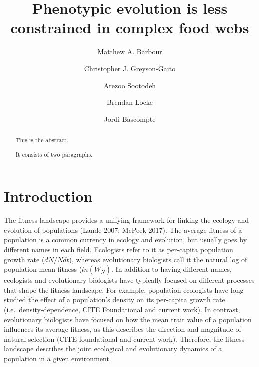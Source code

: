\documentclass[]{elsarticle} %
\begin{document}
\begin{frontmatter}

  \title{Phenotypic evolution is less constrained in complex food webs}
    \author[a,b]{Matthew A. Barbour}
    \author[a,c]{Christopher J. Greyson-Gaito}
  
  
    \author[a]{Arezoo Sootodeh}
  
  
    \author[d]{Brendan Locke}
  
  
    \author[b]{Jordi Bascompte}
  
  
      \address[a]{University of British Columbia, Department of Zoology, 6270 University
Blvd., Vancouver, BC, V6T 1Z4, Canada}
    \address[b]{University of Zurich, Department of Evolutionary Biology and
Environmental Studies, Winterthurerstrasse 190, Zurich, 8057,
Switzerland}
    \address[c]{University of Guelph, Department of Integrative Biology, 50 Stone Rd.
East, Guelph, ONT, N1G 2W1, Canada}
    \address[d]{Humboldt State University, Department of Biological Sciences, 1 Harpst
St., Arcata, CA, 95521, USA}
  
  \begin{abstract}
  This is the abstract.
  
  It consists of two paragraphs.
  \end{abstract}
  
 \end{frontmatter}

\section{Introduction}\label{introduction}

The fitness landscape provides a unifying framework for linking the
ecology and evolution of populations (Lande 2007; McPeek 2017). The
average fitness of a population is a common currency in ecology and
evolution, but usually goes by different names in each field. Ecologists
refer to it as per-capita population growth rate (\(dN/Ndt\)), whereas
evolutionary biologists call it the natural log of population mean
fitness (\(ln(\bar W_N)\). In addition to having different names,
ecologists and evolutionary biologists have typically focused on
different processes that shape the fitness landscape. For example,
population ecologists have long studied the effect of a population's
density on its per-capita growth rate (i.e.~density-dependence, CITE
Foundational and current work). In contrast, evolutionary biologists
have focused on how the mean trait value of a population influences its
average fitness, as this describes the direction and magnitude of
natural selection (CITE foundational and current work). Therefore, the
fitness landscape describes the joint ecological and evolutionary
dynamics of a population in a given environment.
\end{document}
